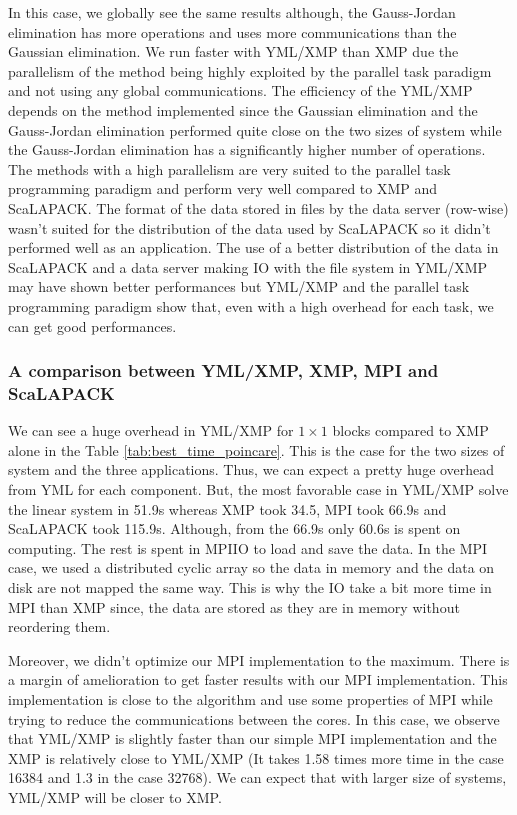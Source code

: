 In this case, we globally see the same results although, the Gauss-Jordan elimination has more operations and uses more communications than the Gaussian elimination.
We run faster with YML/XMP than XMP due the parallelism of the method being highly exploited by the parallel task paradigm and not using any global communications.
The efficiency of the YML/XMP depends on the method implemented since the Gaussian elimination and the Gauss-Jordan elimination performed quite close on the two sizes of system while the Gauss-Jordan elimination has a significantly higher number of operations.
The methods with a high parallelism are very suited to the parallel task programming paradigm and perform very well compared to XMP and ScaLAPACK.
The format of the data stored in files by the data server (row-wise) wasn't suited for the distribution of the data used by ScaLAPACK so it didn't performed well as an application.
The use of a better distribution of the data in ScaLAPACK and a data server making IO with the file system in YML/XMP may have shown better performances but YML/XMP and the parallel task programming paradigm show that, even with a high overhead for each task, we can get good performances.


\subsubsection{A comparison between YML/XMP, XMP, MPI and ScaLAPACK}

We can see a huge overhead in YML/XMP for $1 \times 1$ blocks compared to XMP alone in the Table \ref{tab:best_time_poincare}.
This is the case for the two sizes of system and the three applications.
Thus, we can expect a pretty huge overhead from YML for each component.
But, the most favorable case in YML/XMP solve the linear system in 51.9s whereas XMP took 34.5, MPI took 66.9s and ScaLAPACK took 115.9s.
Although, from the 66.9s only 60.6s is spent on computing.
The rest is spent in MPIIO to load and save the data.
In the MPI case, we used a distributed cyclic array so the data in memory and the data on disk are not mapped the same way.
This is why the IO take a bit more time in MPI than XMP since, the data are stored as they are in memory without reordering them.

Moreover, we didn't optimize our MPI implementation to the maximum.
There is a margin of amelioration to get faster results with our MPI implementation.
This implementation is close to the algorithm and use some properties of MPI while trying to reduce the communications between the cores.
In this case, we observe that YML/XMP is slightly faster than our simple MPI implementation and the XMP is relatively close to YML/XMP (It takes 1.58 times more time in the case 16384 and 1.3 in the case 32768).
We can expect that with larger size of systems, YML/XMP will be closer to XMP.


